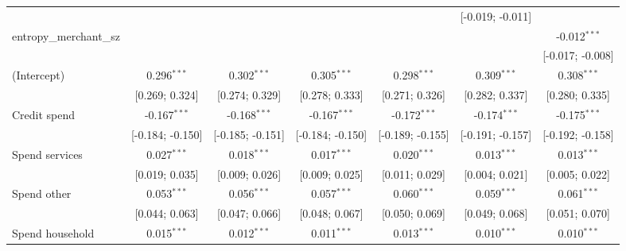 \begin{table}[htbp]
\begin{threeparttable}[b]
\begin{tabular}{lcccccc}
                                   &                                 &                  &                   &                                 & [-0.019; -0.011]  &   \\   
         entropy\_merchant\_sz     &                                 &                  &                   &                                 &                   & -0.012$^{***}$\\   
                                   &                                 &                  &                   &                                 &                   & [-0.017; -0.008]\\   
         (Intercept)               & 0.296$^{***}$                   & 0.302$^{***}$    & 0.305$^{***}$     & 0.298$^{***}$                   & 0.309$^{***}$     & 0.308$^{***}$\\   
                                   & [0.269; 0.324]                  & [0.274; 0.329]   & [0.278; 0.333]    & [0.271; 0.326]                  & [0.282; 0.337]    & [0.280; 0.335]\\   
         Credit spend              & -0.167$^{***}$                  & -0.168$^{***}$   & -0.167$^{***}$    & -0.172$^{***}$                  & -0.174$^{***}$    & -0.175$^{***}$\\   
                                   & [-0.184; -0.150]                & [-0.185; -0.151] & [-0.184; -0.150]  & [-0.189; -0.155]                & [-0.191; -0.157]  & [-0.192; -0.158]\\   
         Spend services            & 0.027$^{***}$                   & 0.018$^{***}$    & 0.017$^{***}$     & 0.020$^{***}$                   & 0.013$^{***}$     & 0.013$^{***}$\\   
                                   & [0.019; 0.035]                  & [0.009; 0.026]   & [0.009; 0.025]    & [0.011; 0.029]                  & [0.004; 0.021]    & [0.005; 0.022]\\   
         Spend other               & 0.053$^{***}$                   & 0.056$^{***}$    & 0.057$^{***}$     & 0.060$^{***}$                   & 0.059$^{***}$     & 0.061$^{***}$\\   
                                   & [0.044; 0.063]                  & [0.047; 0.066]   & [0.048; 0.067]    & [0.050; 0.069]                  & [0.049; 0.068]    & [0.051; 0.070]\\   
         Spend household           & 0.015$^{***}$                   & 0.012$^{***}$    & 0.011$^{***}$     & 0.013$^{***}$                   & 0.010$^{***}$     & 0.010$^{***}$\\   

\end{tabular}
\end{threeparttable}
\end{table}
